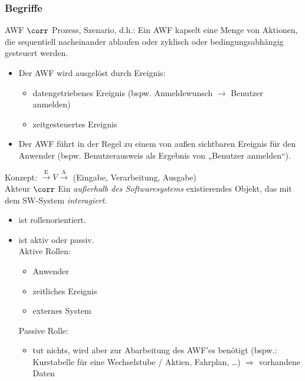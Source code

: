\documentclass{scrreprt}
\begin{document}
\subsubsection{Begriffe}
AWF $\corr$ Prozess, Szenario, d.h.: Ein AWF kapselt eine Menge von Aktionen, die sequentiell nacheinander ablaufen oder zyklisch oder bedingungsabhängig gesteuert werden.
\begin{itemize}
\item Der AWF wird ausgelöst durch Ereignis:
\begin{itemize}[label=$\to$]
\item datengetriebenes Ereignis (bspw. Anmeldewunsch $\to$ Benutzer anmelden)
\item zeitgesteuertes Ereignis
\end{itemize}
\item Der AWF führt in der Regel zu einem von außen sichtbaren Ereignis für den Anwender (bspw. Benutzerausweis als Ergebnis von „Benutzer anmelden“).
\end{itemize}
Konzept: $\overset{\text{E}}{\longrightarrow}\boxed{V}\overset{\text{A}}{\longrightarrow}$ (Eingabe, Verarbeitung, Ausgabe) \bigskip\\
Akteur $\corr$ Ein \emph{außerhalb des Softwaresystems} existierendes Objekt, das mit dem SW-System \emph{interagiert}.
\begin{itemize}
\item ist rollenorientiert.
\item ist aktiv oder passiv.\\
Aktive Rollen:
\begin{itemize}
\item Anwender
\item zeitliches Ereignis
\item externes System
\end{itemize}
Passive Rolle:
\begin{itemize}
\item tut nichts, wird aber zur Abarbeitung des AWF'es benötigt (bspw.: Kurstabelle für eine Wechselstube / Aktien, Fahrplan, …) $\Rightarrow$ vorhandene Daten
\end{itemize}
\end{itemize}
\end{document}
